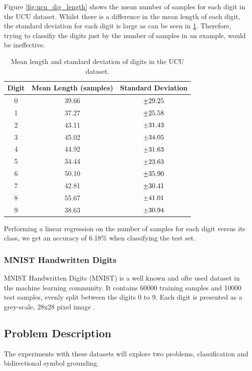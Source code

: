 Figure \ref{fig:ucu_dig_length} shows the mean number of samples for each digit in the UCU dataset. Whilst there is a difference in the mean length of each digit, the standard deviation for each digit is large as can be seen in \ref{tab:UCU_sampLen}. Therefore, trying to classifiy the digits just by the number of samples in an example, would be ineffective.

	\begin{table}
		\centering
		\begin{tabular}{|c|c|c|}
			\hline
			Digit & Mean Length (samples) & Standard Deviation \\ \hline
			0 & 39.66 & $\mypm 29.25$ \\ \hline
			1 & 37.27 & $\mypm 25.58$ \\ \hline
			2 & 43.11 & $\mypm 31.43$ \\ \hline
			3 & 45.02 & $\mypm 34.05$ \\ \hline
			4 & 44.92 & $\mypm 31.63$ \\ \hline
			5 & 34.44 & $\mypm 23.63$ \\ \hline
			6 & 50.10 & $\mypm 35.90$ \\ \hline
			7 & 42.81 & $\mypm 30.41$ \\ \hline
			8 & 55.67 & $\mypm 41.01$ \\ \hline
			9 & 38.63 & $\mypm 30.94$ \\ \hline

		\end{tabular}
		\caption{Mean length and standard deviation of digits in the UCU dataset.}
		\label{tab:UCU_sampLen}
	\end{table}


Performing a linear regression on the number of samples for each digit versus its class, we get an accuracy of 6.18\% when classifying the test set.

\subsubsection{MNIST Handwritten Digits}
MNIST Handwritten Digits (MNIST) is a well known and ofte used dataset in the machine learning community. It contains 60000 training samples and 10000 test samples, evenly split between the digits 0 to 9. 
Each digit is presented as a grey-scale, 28x28 pixel image \cite{lecun1998mnist}. 

\subsection{Problem Description}
The experiments with these datasets will explore two problems, classification and bidirectional symbol grounding. 

